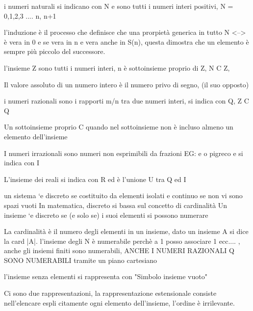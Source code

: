 i numeri naturali si indicano con N e sono tutti i numeri interi positivi, N = {0,1,2,3 .... n, n+1}

l'induzione è il processo che definisce che una prorpietà generica in tutto N <--> è vera
in 0 e se vera in n e vera anche in S(n), questa dimostra che un elemento è sempre più
piccolo del successore. 

l'insieme Z sono tutti i numeri interi, n è sottoinsieme proprio di Z, N C Z, 

Il valore assoluto di un numero intero è il numero privo di segno, (il suo opposto)

i numeri razionali sono i rapporti m/n tra due numeri interi, si indica con Q, Z C Q

Un sottoinsieme proprio C quando nel sottoinsieme non è incluso almeno un elemento dell'insieme

I numeri irrazionali sono numeri non esprimibili da frazioni EG: e o pigreco e si indica con I

L'insieme dei reali si indica con R ed è l'unione U tra Q ed I

un sistema `e discreto se costituito da elementi isolati e continuo se non vi sono spazi vuoti
In matematica, discreto si bassa sul concetto di cardinalità Un insieme `e discreto se (e solo se) i suoi elementi si
possono numerare

La cardinalità è il numero degli elementi in un insieme, dato un insieme A si dice la card
|A|. l'insieme degli N è numerabile perchè a 1 posso associare 1 ecc.... , anche gli insiemi
finiti sono numerabili, ANCHE I NUMERI RAZIONALI Q SONO NUMERABILI tramite un piano cartesiano

l'insieme senza elementi si rappresenta con "Simbolo insieme vuoto"

Ci sono due rappresentazioni, la rappresentazione estensionale consiste nell'elencare espli
citamente ogni elemento dell'insieme, l'ordine è irrilevante.
